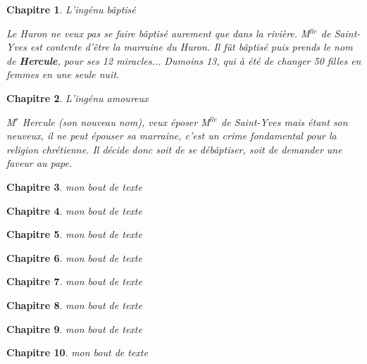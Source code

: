 \documentclass[12pt,a4paper]{article}
\newtheorem{chap}{Chapitre}
\begin{document}
\begin{chap}
{\selectfont \par
L'ingénu bâptisé\par
	Le Huron ne veux pas se faire bâptisé aurement que dans la rivière.
	M$^{lle}$ de Saint-Yves est contente d'être la marraine du Huron.
	Il fût bâptisé puis prends le nom de \textbf{Hercule}, pour ses 12 miracles...
	Dumoins 13, qui à été de changer 50 filles en femmes en une seule nuit.

}

\end{chap}
\begin{chap}
{\selectfont \par
L'ingénu amoureux \par
M$^r$ Hercule (son nouveau nom), veux époser M$^{lle}$ de Saint-Yves mais étant son neuveux, il ne peut épouser sa marraine, c'est un crime fondamental pour la religion chrétienne.
Il décide donc soit de se débâptiser, soit de demander une faveur au pape.



}

\end{chap}
\begin{chap}
{\selectfont mon bout de texte}

\end{chap}
\begin{chap}
{\selectfont mon bout de texte}

\end{chap}
\begin{chap}
{\selectfont mon bout de texte}

\end{chap}
\begin{chap}
{\selectfont mon bout de texte}

\end{chap}
\begin{chap}
{\selectfont mon bout de texte}

\end{chap}
\begin{chap}
{\selectfont mon bout de texte}

\end{chap}
\begin{chap}
{\selectfont mon bout de texte}

\end{chap}
\begin{chap}
{\selectfont mon bout de texte}

\end{chap}
\end{document}
